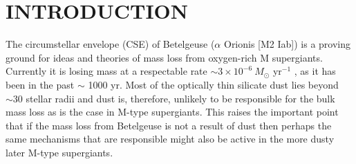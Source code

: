 \documentclass[iop]{emulateapj}
\begin{document}

\section{INTRODUCTION}
The circumstellar envelope (CSE) of Betelgeuse ($\alpha$ Orionis [M2 Iab]) is a proving ground for ideas and theories of mass loss from oxygen-rich M supergiants. Currently it is losing mass at a respectable rate $\sim 3\times 10^{-6} \ M{}_{\odot}$ yr${}^{-1}$ \citep{1986ApJ...306..605G, 1994ApJ...424L.127H,harper_2001}, as it has been in the past $\sim$ 1000 yr. Most of the optically thin silicate dust lies beyond $\sim 30$ stellar radii \citep{1994AJ....107.1469D} and dust is, therefore, unlikely to be responsible for the bulk mass loss as is the case in M-type supergiants. This raises the important point that if the mass loss from Betelgeuse is not a result of dust then perhaps the same mechanisms that are responsible might also be active in the more dusty later M-type supergiants. 
\end{document}
